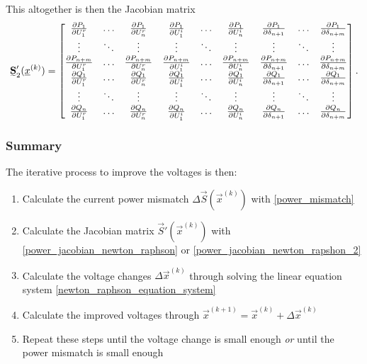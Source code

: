 This altogether is then the Jacobian matrix
\begin{equation}
	\mat S_2' (\vec x^{(k)}) = 
	\begin{bmatrix}
		\frac{\partial P_1}{\partial U_1^r}	& \hdots & \frac{\partial P_1}{\partial U_n^r} & \frac{\partial P_1}{\partial U_1^i} & \hdots & \frac{\partial P_1}{\partial U_n^i}	& \frac{\partial P_1}{\partial \delta_{n + 1}} & \hdots & \frac{\partial P_1}{\partial \delta_{n + m}} \\
		\vdots & \ddots	& \vdots & \vdots & \ddots & \vdots & \vdots & \ddots & \vdots \\
		\frac{\partial P_{n + m}}{\partial U_1^r} & \hdots & \frac{\partial P_{n + m}}{\partial U_n^r} & \frac{\partial P_{n + m}}{\partial U_1^i} & \hdots & \frac{\partial P_{n + m}}{\partial U_n^i} & \frac{\partial P_{n + m}}{\partial \delta_{n + 1}} & \hdots & \frac{\partial P_{n + m}}{\partial \delta_{n + m}} \\
		\frac{\partial Q_1}{\partial U_1^r}	& \hdots & \frac{\partial Q_1}{\partial U_n^r} & \frac{\partial Q_1}{\partial U_1^i} & \hdots & \frac{\partial Q_1}{\partial U_n^i}	& \frac{\partial Q_1}{\partial \delta_{n + 1}} & \hdots & \frac{\partial Q_1}{\partial \delta_{n + m}} \\
		\vdots & \ddots	& \vdots & \vdots & \ddots & \vdots & \vdots & \ddots & \vdots \\
		\frac{\partial Q_n}{\partial U_1^r} & \hdots & \frac{\partial Q_n}{\partial U_n^r} & \frac{\partial Q_n}{\partial U_1^i} & \hdots & \frac{\partial Q_n}{\partial U_n^i} & \frac{\partial Q_n}{\partial \delta_{n + 1}} & \hdots & \frac{\partial Q_n}{\partial \delta_{n + m}} \\
	\end{bmatrix}.
	\label{eq:power_jacobian_newton_rapshon_2}
\end{equation}

\subsubsection{Summary}
The iterative process to improve the voltages is then:
\begin{enumerate}
	\item Calculate the current power mismatch $\Delta \vec S (\vec x^{(k)})$ with \eqref{power_mismatch}
	\item Calculate the Jacobian matrix $\vec S' (\vec x^{(k)})$ with \eqref{power_jacobian_newton_raphson} or \eqref{power_jacobian_newton_rapshon_2}
	\item Calculate the voltage changes $\Delta \vec x^{(k)}$ through solving the linear equation system \eqref{newton_raphson_equation_system}
	\item Calculate the improved voltages through $\vec x^{(k+1)} = \vec x^{(k)} + \Delta \vec x^{(k)}$
	\item Repeat these steps until the voltage change is small enough \emph{or} until the power mismatch is small enough
\end{enumerate}


